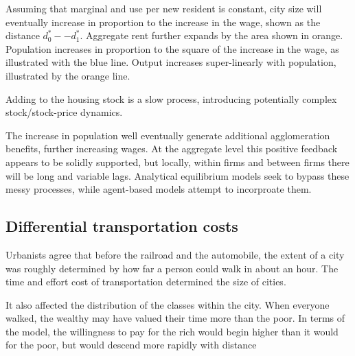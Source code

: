 Assuming that marginal and use per new resident is constant, city size will eventually increase in proportion to the increase in the wage, shown as the distance $d^*_0--d^*_1$. Aggregate rent  further expands by the area shown in orange. Population increases in proportion to the square of the increase in the wage, as illustrated with the blue line.  Output increases super-linearly with population, illustrated by the orange line. 

Adding to the  housing stock is a slow process, introducing potentially complex stock/stock-price dynamics.

The increase in population well eventually generate additional agglomeration benefits, further increasing wages. At the aggregate level this positive feedback appears to be solidly supported, but locally, within firms and between firms there will be long and variable lags. Analytical equilibrium models seek to bypass these messy processes, while agent-based models attempt to incorproate them.

\subsection{Differential transportation costs}
 Urbanists agree that before the railroad and the automobile, the extent of a city was roughly determined by how far a person could walk in about an hour. The time and effort cost of transportation determined the size of cities. 
 
 It also affected the distribution of the classes within the city. When everyone walked, the  wealthy may have valued their time more than the poor. In terms of the model, the willingness to pay for the rich would begin higher than it would for the poor, but would descend more rapidly with distance

\begin{center}
\end{center}


